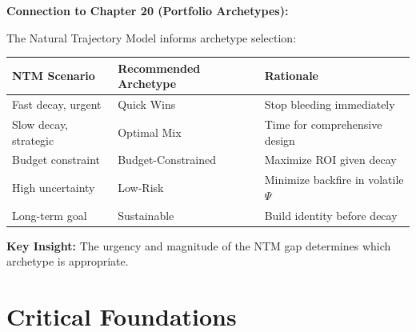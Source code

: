 \begin{tcolorbox}[colback=orange!5!white, colframe=orange!75!black,
    title=\textbf{Application: NTM for Portfolio Archetype Selection}]

\textbf{Connection to Chapter 20 (Portfolio Archetypes):}

The Natural Trajectory Model informs archetype selection:

\begin{center}
\renewcommand{\arraystretch}{1.2}
\begin{tabular}{@{}lll@{}}
\toprule
\textbf{NTM Scenario} & \textbf{Recommended Archetype} & \textbf{Rationale} \\
\midrule
Fast decay, urgent & Quick Wins & Stop bleeding immediately \\
Slow decay, strategic & Optimal Mix & Time for comprehensive design \\
Budget constraint & Budget-Constrained & Maximize ROI given decay \\
High uncertainty & Low-Risk & Minimize backfire in volatile $\Psi$ \\
Long-term goal & Sustainable & Build identity before decay \\
\bottomrule
\end{tabular}
\end{center}

\textbf{Key Insight:} The urgency and magnitude of the NTM gap determines which archetype is appropriate.

\end{tcolorbox}

\section{Critical Foundations}
\label{sec:untcm-critical}

